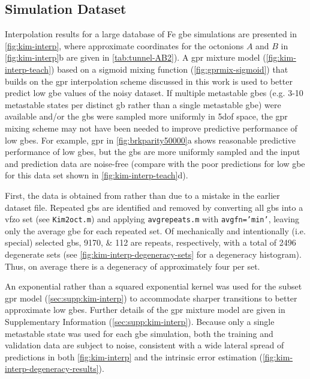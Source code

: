 \documentclass[final,twocolumn,12pt]{elsarticle}
\newcommand{\inpt}{input}
\newcommand{\outpt}{prediction}
\begin{document}
{\subsection{Simulation Dataset}
\label{sec:results:simulation}
Interpolation results for a large database of Fe \gls{gbe} simulations \cite{kimPhasefieldModeling3D2014} are presented in \cref{fig:kim-interp}, where approximate coordinates for the octonions $A$ and $B$ in \cref{fig:kim-interp}b are given in \cref{tab:tunnel-AB2}). A \gls{gpr} mixture model (\cref{fig:kim-interp-teach}) based on a sigmoid mixing function (\cref{fig:gprmix-sigmoid}) that builds on the \gls{gpr} interpolation scheme discussed in this work is used to better predict low \gls{gbe} values of the noisy dataset. If multiple metastable \glspl{gbe} (e.g. 3-10 metastable states per distinct \gls{gb} rather than a single metastable \gls{gbe}) were available and/or the \glspl{gb} were sampled more uniformly in \gls{5dof} space, the \gls{gpr} mixing scheme may not have been needed to improve predictive performance of low \glspl{gbe}. For example, \gls{gpr} in \cref{fig:brkparity50000}a shows reasonable predictive performance of low \glspl{gbe}, but the \glspl{gb} are more uniformly sampled and the \inpt{} and \outpt{} data are noise-free (compare with the poor predictions for low \gls{gbe} for this data set shown in \cref{fig:kim-interp-teach}d).

First, the data is obtained from \cite{kimPhasefieldModeling3D2014} rather than \cite{kimIdentificationSchemeGrain2011} due to a mistake in the earlier dataset file. Repeated \glspl{gb} are identified and removed by converting all \glspl{gb} into a \gls{vfzo} set (see \texttt{Kim2oct.m}) and applying \texttt{avgrepeats.m} with \texttt{avgfn='min'}, leaving only the average \gls{gbe} for each repeated set. Of mechanically and intentionally (i.e. special) selected \glspl{gb}, \numlist{9170;112} are repeats, respectively, with a total of \num{2496} degenerate sets (see \cref{fig:kim-interp-degeneracy-sets} for a degeneracy histogram). Thus, on average there is a degeneracy of approximately four per set.

An exponential rather than a squared exponential kernel was used for the subset \gls{gpr} model (\cref{sec:supp:kim-interp}) to accommodate sharper transitions to better approximate low \glspl{gbe}. Further details of the \gls{gpr} mixture model are given in Supplementary Information (\cref{sec:supp:kim-interp}). Because only a single metastable state was used for each \gls{gbe} simulation, both the training and validation data are subject to noise, consistent with a wide lateral spread of predictions in both \cref{fig:kim-interp} and the intrinsic error estimation (\cref{fig:kim-interp-degeneracy-results}).

}
\end{document}
